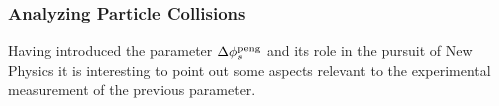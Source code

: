 %
%
%

\subsubsection{Analyzing Particle Collisions}
Having introduced the parameter $\Delta\phi_{s}^{\tiny\text{peng}}$ and its role in the pursuit of New Physics
it is interesting to point out some aspects relevant to the experimental measurement of the previous parameter.

